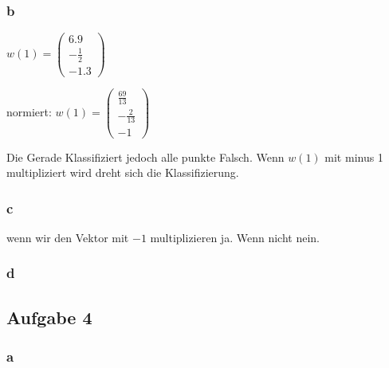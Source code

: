\documentclass{article}
\begin{document}
		\subsubsection{b}
		$w(1) = \begin{pmatrix}
			6.9 \\
			-\frac{1}{2}\\
			-1.3
		\end{pmatrix}$
		
		normiert: 
		$w(1) = \begin{pmatrix}
		\frac{69}{13} \\
		-\frac{2}{13}\\
		-1
		\end{pmatrix}$
		
		\begin{figure}[h]
		\end{figure}
		Die Gerade Klassifiziert jedoch alle punkte Falsch. Wenn $w(1)$ mit minus 1 multipliziert wird dreht sich die Klassifizierung.
		
		\subsubsection{c}
		 wenn wir den Vektor mit $-1$ multiplizieren ja. Wenn nicht nein.
		
		\subsubsection{d}

\subsection{Aufgabe 4}

\subsubsection{a}
	
\end{document}
